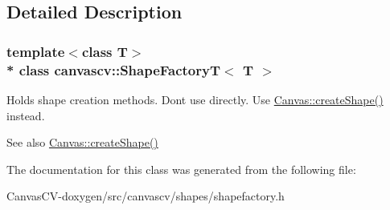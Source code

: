 \subsection{Detailed Description}
\subsubsection*{template$<$class T$>$\\*
class canvascv\+::\+Shape\+Factory\+T$<$ T $>$}

Holds shape creation methods. Don\textquotesingle{}t use directly. Use \hyperlink{classcanvascv_1_1Canvas_a630ac92458f1718d0c597e96dd5a4aef}{Canvas\+::create\+Shape()} instead. \begin{DoxySeeAlso}{See also}
\hyperlink{classcanvascv_1_1Canvas_a630ac92458f1718d0c597e96dd5a4aef}{Canvas\+::create\+Shape()} 
\end{DoxySeeAlso}


The documentation for this class was generated from the following file\+:\begin{DoxyCompactItemize}
\item 
Canvas\+C\+V-\/doxygen/src/canvascv/shapes/shapefactory.\+h\end{DoxyCompactItemize}
